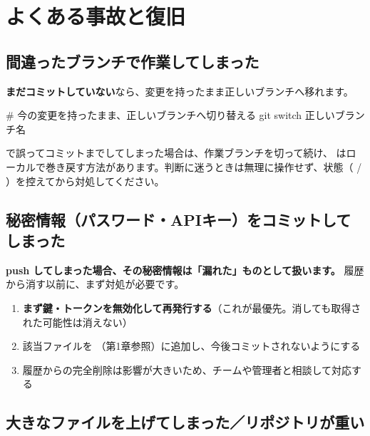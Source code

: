 \section{よくある事故と復旧}

\subsection{間違ったブランチで作業してしまった}

\textbf{まだコミットしていない}なら、変更を持ったまま正しいブランチへ移れます。

\begin{codebox}[bash]
\begin{code}
# 今の変更を持ったまま、正しいブランチへ切り替える
git switch 正しいブランチ名
\end{code}
\end{codebox}

 で誤ってコミットまでしてしまった場合は、作業ブランチを切って続け、 はローカルで巻き戻す方法があります。判断に迷うときは無理に操作せず、状態（ / ）を控えてから対処してください。

\subsection{秘密情報（パスワード・APIキー）をコミットしてしまった}

\begin{warnbox}
\textbf{push してしまった場合、その秘密情報は「漏れた」ものとして扱います。} 履歴から消す以前に、まず対処が必要です。
\end{warnbox}

\begin{enumerate}[leftmargin=1.6em]
  \item \textbf{まず鍵・トークンを無効化して再発行する}（これが最優先。消しても取得された可能性は消えない）
  \item 該当ファイルを （第1章参照）に追加し、今後コミットされないようにする
  \item 履歴からの完全削除は影響が大きいため、チームや管理者と相談して対応する
\end{enumerate}

\subsection{大きなファイルを上げてしまった／リポジトリが重い}

